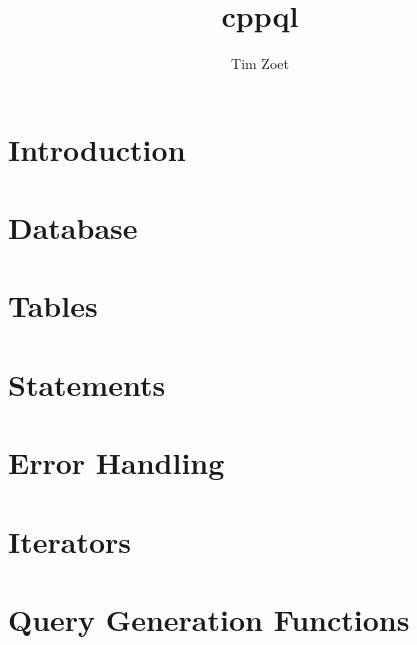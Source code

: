 \documentclass[twoside,a4paper,smallborder=true]{refart}
\title{cppql}
\author{Tim Zoet}
\date{}
\begin{document}
\maketitle

\tableofcontents
\newpage

\section{Introduction}
\label{section:introduction}

\newpage

\section{Database}
\label{section:database}

\newpage

\section{Tables}
\label{section:tables}

\newpage

\section{Statements}
\label{section:statements}

\newpage

\section{Error Handling}
\label{section:errors}
%
\newpage

\section{Iterators}
\label{section:iterators}
%
\newpage

\section{Query Generation Functions}
\label{section:gen}
%
\newpage

 
 
\printindex
\end{document}
